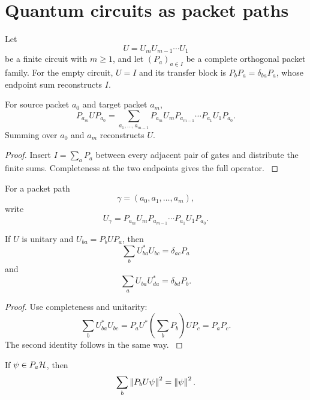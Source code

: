 \section{Quantum circuits as packet paths}\label{strong:section:004}\label{strong:sec:circuits}

Let
\[
U=U_mU_{m-1}\cdots U_1
\]
be a finite circuit with \(m\ge1\), and let \((P_a)_{a\in I}\) be a complete orthogonal packet family. For the empty circuit, \(U=I\) and its transfer block is \(P_bP_a=\delta_{ba}P_a\), whose endpoint sum reconstructs \(I\).

\begin{theorem}\label{strong:theorem:007}\label{strong:thm:circuit_path}
For source packet \(a_0\) and target packet \(a_m\),
\[
P_{a_m}UP_{a_0}
=
\sum_{a_1,\ldots,a_{m-1}}
P_{a_m}U_mP_{a_{m-1}}
\cdots
P_{a_1}U_1P_{a_0}.
\]
Summing over \(a_0\) and \(a_m\) reconstructs \(U\).
\end{theorem}

\begin{proof}\label{strong:proof:012}
Insert \(I=\sum_aP_a\) between every adjacent pair of gates and distribute the finite sums. Completeness at the two endpoints gives the full operator.
\label{strong:proof:012:end}\end{proof}

For a packet path
\[
\gamma=(a_0,a_1,\ldots,a_m),
\]
write
\[
U_\gamma
=
P_{a_m}U_mP_{a_{m-1}}
\cdots
P_{a_1}U_1P_{a_0}.
\]

\begin{theorem}\label{strong:theorem:008}\label{strong:thm:packet_unitarity}
If \(U\) is unitary and \(U_{ba}=P_bUP_a\), then
\[
\sum_bU_{ba}^*U_{bc}=\delta_{ac}P_a
\]
and
\[
\sum_aU_{ba}U_{da}^*=\delta_{bd}P_b.
\]
\end{theorem}

\begin{proof}\label{strong:proof:013}
Use completeness and unitarity:
\[
\sum_bU_{ba}^*U_{bc}
=
P_aU^*\left(\sum_bP_b\right)UP_c
=P_aP_c.
\]
The second identity follows in the same way.
\label{strong:proof:013:end}\end{proof}

\begin{corollary}\label{strong:corollary:005}\label{strong:cor:packet_probability}
If \(\psi\in P_a\mathcal H\), then
\[
\sum_b\left\lVert P_bU\psi\right\rVert^2=\left\lVert\psi\right\rVert^2.
\]
\end{corollary}

